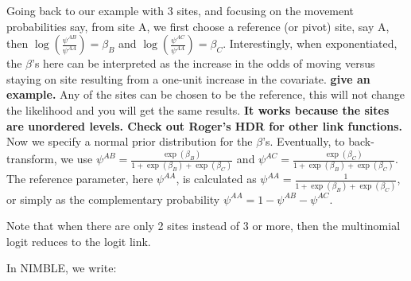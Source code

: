 \documentclass[
  12pt,
]{krantz}
\begin{document}
Going back to our example with \(3\) sites, and focusing on the movement probabilities say, from site A, we first choose a reference (or pivot) site, say A, then \(\log\left(\displaystyle{\frac{\psi^{AB}}{\psi^{AA}}}\right) = \beta_B\) and \(\log\left(\displaystyle{\frac{\psi^{AC}}{\psi^{AA}}}\right) = \beta_C\). Interestingly, when exponentiated, the \(\beta\)'s here can be interpreted as the increase in the odds of moving versus staying on site resulting from a one-unit increase in the covariate. \textbf{give an example.} Any of the sites can be chosen to be the reference, this will not change the likelihood and you will get the same results. \textbf{It works because the sites are unordered levels. Check out Roger's HDR for other link functions.} Now we specify a normal prior distribution for the \(\beta\)'s. Eventually, to back-transform, we use \(\psi^{AB} = \displaystyle{\frac{\exp(\beta_B)}{1+\displaystyle{\exp(\beta_B)+\displaystyle{\exp(\beta_C)}}}}\) and \(\psi^{AC} = \displaystyle{\frac{\exp(\beta_C)}{1+\displaystyle{\exp(\beta_B)+\displaystyle{\exp(\beta_C)}}}}\). The reference parameter, here \(\psi^{AA}\), is calculated as \(\psi^{AA} = \displaystyle{\frac{1}{1 + \displaystyle{\exp(\beta_B)+\displaystyle{\exp(\beta_C)}}}}\), or simply as the complementary probability \(\psi^{AA} = 1 - \psi^{AB} - \psi^{AC}\).

Note that when there are only 2 sites instead of 3 or more, then the multinomial logit reduces to the logit link.

In NIMBLE, we write:
\end{document}
